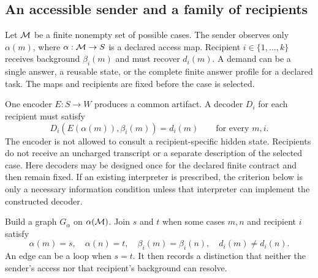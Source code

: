 \subsection{An accessible sender and a family of recipients}
Let $\mathcal M$ be a finite nonempty set of possible cases. The sender observes only $\alpha(m)$, where $\alpha:\mathcal M\to S$ is a declared access map. Recipient $i\in\{1,\ldots,k\}$ receives background $\beta_i(m)$ and must recover $d_i(m)$. A demand can be a single answer, a reusable state, or the complete finite answer profile for a declared task. The maps and recipients are fixed before the case is selected.

One encoder $E:S\to W$ produces a common artifact. A decoder $D_i$ for each recipient must satisfy
\begin{equation}\label{MU:eq:audience-contract}
D_i(E(\alpha(m)),\beta_i(m))=d_i(m)\qquad\text{for every }m,i.
\end{equation}
The encoder is not allowed to consult a recipient-specific hidden state. Recipients do not receive an uncharged transcript or a separate description of the selected case. Here decoders may be designed once for the declared finite contract and then remain fixed. If an existing interpreter is prescribed, the criterion below is only a necessary information condition unless that interpreter can implement the constructed decoder.

Build a graph $G_\alpha$ on $\alpha(\mathcal M)$. Join $s$ and $t$ when some cases $m,n$ and recipient $i$ satisfy
\[
\alpha(m)=s,\quad\alpha(n)=t,\quad
\beta_i(m)=\beta_i(n),\quad d_i(m)\ne d_i(n).
\]
An edge can be a loop when $s=t$. It then records a distinction that neither the sender's access nor that recipient's background can resolve.


